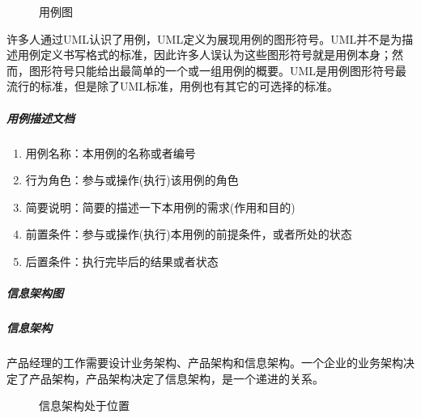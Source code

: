 \documentclass[letterpaper,10pt,english]{sphinxmanual}
\begin{document}
\begin{figure}[H]
\centering
\capstart

\noindent{}
\caption{用例图}\label{\detokenize{chapter_knowledge/flow_chart:id47}}\end{figure}

许多人通过UML认识了用例，UML定义为展现用例的图形符号。UML并不是为描述用例定义书写格式的标准，因此许多人误认为这些图形符号就是用例本身；然而，图形符号只能给出最简单的一个或一组用例的概要。UML是用例图形符号最流行的标准，但是除了UML标准，用例也有其它的可选择的标准。


\subparagraph{用例描述文档}
\label{\detokenize{chapter_knowledge/flow_chart:id30}}\begin{enumerate}
%
\item {} 
用例名称：本用例的名称或者编号

\item {} 
行为角色：参与或操作(执行)该用例的角色

\item {} 
简要说明：简要的描述一下本用例的需求(作用和目的)

\item {} 
前置条件：参与或操作(执行)本用例的前提条件，或者所处的状态

\item {} 
后置条件：执行完毕后的结果或者状态

\end{enumerate}


\subparagraph{信息架构图}
\label{\detokenize{chapter_knowledge/flow_chart:information-infra}}\label{\detokenize{chapter_knowledge/flow_chart:id31}}

\subparagraph{信息架构}
\label{\detokenize{chapter_knowledge/flow_chart:id32}}
产品经理的工作需要设计业务架构、产品架构和信息架构。一个企业的业务架构决定了产品架构，产品架构决定了信息架构，是一个递进的关系。%
\begin{footnote}[595]\sphinxAtStartFootnote
{}
%
\end{footnote}

\begin{figure}[H]
\centering
\capstart

\noindent{}
\caption{信息架构处于位置}\label{\detokenize{chapter_knowledge/flow_chart:id48}}\end{figure}
\end{document}
